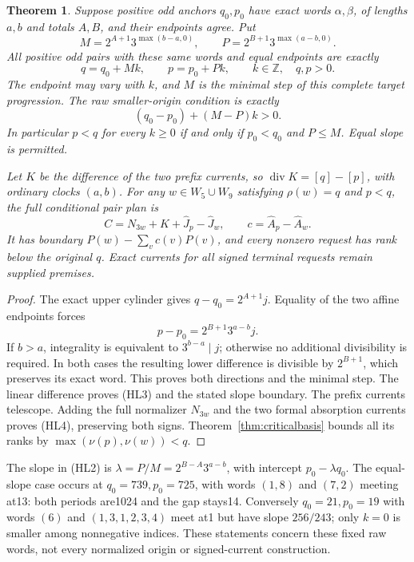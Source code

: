 \documentclass[11pt]{article}
\newtheorem{theorem}{Theorem}
\begin{document}
\begin{theorem}\label{thm:historylifting}
Suppose positive odd anchors $q_0,p_0$ have exact words $\alpha,\beta$,
of lengths $a,b$ and totals $A,B$, and their endpoints agree. Put
\[
 M=2^{A+1}3^{\max(b-a,0)},\qquad
 P=2^{B+1}3^{\max(a-b,0)}.
 \tag{HL1}
\]
All positive odd pairs with these same words and equal endpoints are
exactly
\[
 q=q_0+Mk,\qquad p=p_0+Pk,\qquad
 k\in\mathbb Z,\quad q,p>0.
 \tag{HL2}
\]
The endpoint may vary with $k$, and $M$ is the minimal step of this
complete target progression. The raw smaller-origin condition is exactly
\[
 (q_0-p_0)+(M-P)k>0.
 \tag{HL3}
\]
In particular $p<q$ for every $k\ge0$ if and only if
$p_0<q_0$ and $P\le M$. Equal slope is permitted.

Let $K$ be the difference of the two prefix currents, so
$\operatorname{div}K=[q]-[p]$, with ordinary clocks $(a,b)$.
For any $w\in W_5\cup W_9$ satisfying $\rho(w)=q$ and $p<q$,
the full conditional pair plan is
\[
 C=N_{3w}+K+\widehat J_p-\widehat J_w,\qquad
 c=\widehat A_p-\widehat A_w.
 \tag{HL4}
\]
It has boundary $P(w)-\sum_v c(v)P(v)$, and every nonzero request
has rank below the original $q$. Exact currents for all signed
terminal requests remain supplied premises.
\end{theorem}
\begin{proof}
The exact upper cylinder gives $q-q_0=2^{A+1}j$.
Equality of the two affine endpoints forces
\[
 p-p_0=2^{B+1}3^{a-b}j.
\]
If $b>a$, integrality is equivalent to $3^{b-a}\mid j$;
otherwise no additional divisibility is required. In both cases the
resulting lower difference is divisible by $2^{B+1}$, which preserves
its exact word. This proves both directions and the minimal step.
The linear difference proves (HL3) and the stated slope boundary.
The prefix currents telescope. Adding the full normalizer $N_{3w}$
and the two formal absorption currents proves (HL4), preserving both
signs. Theorem~\ref{thm:criticalbasis} bounds all its ranks by
$\max(\nu(p),\nu(w))<q$.
\end{proof}

The slope in (HL2) is
$\lambda=P/M=2^{B-A}3^{a-b}$, with intercept
$p_0-\lambda q_0$. The equal-slope case occurs at
$q_0=739,p_0=725$, with words $(1,8)$ and $(7,2)$ meeting at13:
both periods are1024 and the gap stays14. Conversely $q_0=21,p_0=19$
with words $(6)$ and $(1,3,1,2,3,4)$ meet at1 but have slope
$256/243$; only $k=0$ is smaller among nonnegative indices.
These statements concern these fixed raw words, not every normalized
origin or signed-current construction.
\end{document}
